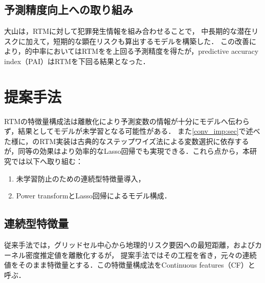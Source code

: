 \subsection{予測精度向上への取り組み}
大山\cite{大山智也2020日本}は，RTMに対して犯罪発生情報を組み合わせることで，
中長期的な潜在リスクに加えて，短期的な顕在リスクも算出するモデルを構築した．
この改善により，的中率においてはRTMをを上回る予測精度を得たが，predictive accuracy index（PAI）はRTMを下回る結果となった．

\section{提案手法}
\label{chapter_3}
RTMの特徴量構成法は離散化により予測変数の情報が十分にモデルへ伝わらず，結果としてモデルが未学習となる可能性がある．
また\cref{conv_imp:sec}で述べた様に，\cite{caplan2015risk}のRTM実装は古典的なステップワイズ法\cite{islp}による変数選択に依存するが，同等の効果はより効率的なLasso回帰\cite{Lasso}でも実現できる．これら点から，本研究では以下へ取り組む：
\begin{enumerate}
  \item 未学習防止のための連続型特徴量導入，
  \item Power transformとLasso回帰によるモデル構成．
\end{enumerate}

\subsection{連続型特徴量}
従来手法\cite{caplan2015risk}では，グリッドセル中心から地理的リスク要因への最短距離，およびカーネル密度推定値を離散化するが，
提案手法ではその工程を省き，元々の連続値をそのまま特徴量とする．この特徴量構成法をContinuous features（CF）と呼ぶ．

